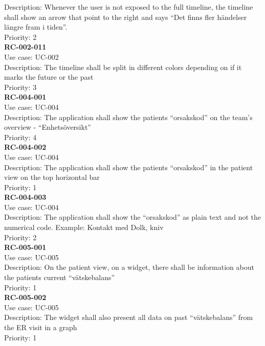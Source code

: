 Description: Whenever the user is not exposed to the full timeline, the timeline shall show an arrow that point to the right and says “Det finns fler händelser längre fram i tiden”. \\
Priority: 2 \\
\newline
\textbf{RC-002-011} \\
Use case: UC-002 \\
Description: The timeline shall be split in different colors depending on if it marks the future or the past\\
Priority: 3\\
\newline
\textbf{RC-004-001} \\
Use case: UC-004 \\
Description: The application shall show the patients “orsakskod” on the team’s overview - “Enhetsöversikt” \\
Priority: 4 \\
\newline
\textbf{RC-004-002} \\
Use case: UC-004 \\
Description: The application shall show the patients “orsakskod” in the patient view on the top horizontal bar \\
Priority: 1 \\
\newline
\textbf{RC-004-003} \\
Use case: UC-004 \\
Description: The application shall show the “orsakskod” as plain text and not the numerical code. Example: Kontakt med Dolk, kniv \\
Priority: 2 \\
\newline
\textbf{RC-005-001} \\
Use case: UC-005 \\
Description: On the patient view, on a widget, there shall be information about the patients current “vätskebalans” \\
Priority: 1 \\
\newline
\textbf{RC-005-002} \\
Use case: UC-005 \\
Description: The widget shall also present all data on past “vätskebalans” from the ER visit in a graph\\
Priority: 1 \\
\newline
